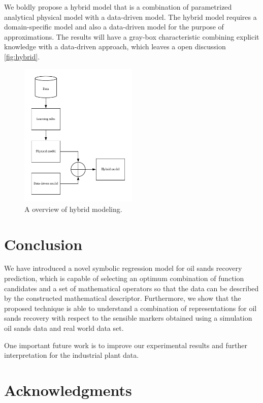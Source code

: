 \documentclass[final,5p,times,twocolumn]{elsarticle}
\begin{document}
We boldly propose a hybrid model that is a combination of parametrized analytical physical model with a data-driven model. The hybrid model requires a domain-specific model and also a data-driven model for the purpose of approximations. The results will have a gray-box characteristic combining explicit knowledge with a data-driven approach, which leaves a open discussion \autoref{fig:hybrid}.

\begin{figure}[!hptb]
	\centering
	\includegraphics[width=0.5\textwidth]{hybrid.png}
	\caption{A overview of hybrid modeling.}
	\label{fig:hybrid}
\end{figure}


\section{Conclusion} %
\label{sec:conclusion}
We have introduced a novel symbolic regression model for oil sands recovery prediction, which is capable of selecting an optimum combination of function candidates and a set of mathematical operators so that the data can be described by the constructed mathematical descriptor. Furthermore, we show that the proposed technique is able to understand a combination of representations for oil sands recovery with respect to the sensible markers obtained using a simulation oil sands data and real world data set.

One important future work is to improve our experimental results and further interpretation for the industrial plant data.


\section*{Acknowledgments}
\end{document}
